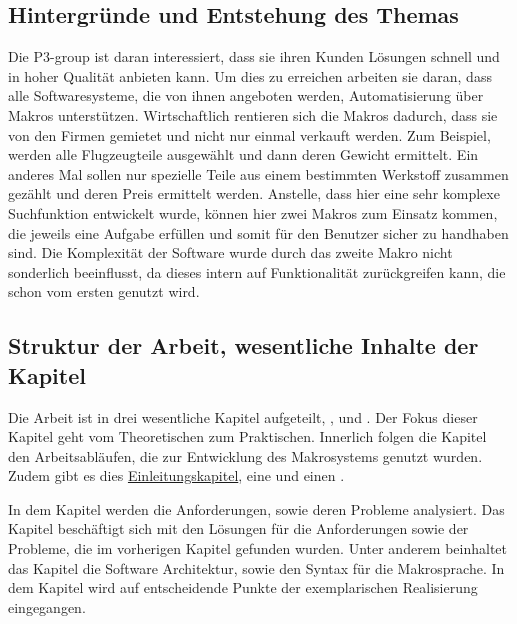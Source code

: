   \subsection{Hintergründe und Entstehung des Themas}
  \label{ssec:Hintergründe und Entstehung des Themas}
    Die P3-group ist daran interessiert, dass sie ihren Kunden Lösungen schnell und in hoher Qualität anbieten kann. Um dies zu erreichen arbeiten sie daran, dass alle Softwaresysteme, die von ihnen angeboten werden, Automatisierung über Makros unterstützen. Wirtschaftlich rentieren sich die Makros dadurch, dass sie von den Firmen gemietet und nicht nur einmal verkauft werden. Zum Beispiel, werden alle Flugzeugteile ausgewählt und dann deren Gewicht ermittelt. Ein anderes Mal sollen nur spezielle Teile aus einem bestimmten Werkstoff zusammen gezählt und deren Preis ermittelt werden. Anstelle, dass hier eine sehr komplexe Suchfunktion entwickelt wurde, können hier zwei Makros zum Einsatz kommen, die jeweils eine Aufgabe erfüllen und somit für den Benutzer sicher zu handhaben sind. Die Komplexität der Software wurde durch das zweite Makro nicht sonderlich beeinflusst, da dieses intern auf Funktionalität zurückgreifen kann, die schon vom ersten genutzt wird.

  \subsection{Struktur der Arbeit, wesentliche Inhalte der Kapitel}
  \label{ssec:Struktur der Arbeit, wesentliche Inhalte der Kapitel}
    Die Arbeit ist in drei wesentliche Kapitel aufgeteilt, ,  und . Der Fokus dieser Kapitel geht vom Theoretischen zum Praktischen. Innerlich folgen die Kapitel den Arbeitsabläufen, die zur Entwicklung des Makrosystems genutzt wurden. Zudem gibt es dies \hyperref[sec:Einleitung]{Einleitungskapitel}, eine  und einen .

    In dem Kapitel  werden die Anforderungen, sowie deren Probleme analysiert. Das Kapitel  beschäftigt sich mit den Lösungen für die Anforderungen sowie der Probleme, die im vorherigen Kapitel gefunden wurden. Unter anderem beinhaltet das Kapitel die Software Architektur, sowie den Syntax für die Makrosprache. In dem Kapitel  wird auf entscheidende Punkte der exemplarischen Realisierung eingegangen.

